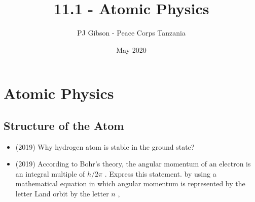 \documentclass{article}
\title{11.1 - Atomic Physics}
\author{PJ Gibson - Peace Corps Tanzania}
\date{May 2020}
\begin{document}
\maketitle


\section{Atomic Physics}

\subsection{Structure of the Atom}
\begin{itemize}
\item (2019)  Why hydrogen atom is stable in the ground state? 
\item (2019)  According to Bohr’s theory, the angular momentum of an electron is an integral multiple of $ h/2\pi$ .  Express this statement. by using a mathematical equation in which angular momentum is represented by the letter Land orbit by the letter $ n$ , 
\end{itemize}
\end{document}
